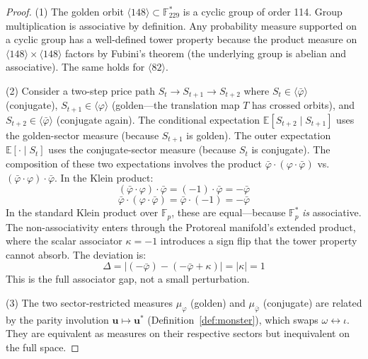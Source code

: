 \begin{proof}
(1) The golden orbit $\langle 148 \rangle \subset \mathbb{F}_{229}^*$ is a cyclic group of order 114. Group multiplication is associative by definition. Any probability measure supported on a cyclic group has a well-defined tower property because the product measure on $\langle 148 \rangle \times \langle 148 \rangle$ factors by Fubini's theorem (the underlying group is abelian and associative). The same holds for $\langle 82 \rangle$.

(2) Consider a two-step price path $S_t \to S_{t+1} \to S_{t+2}$ where $S_t \in \langle\bar\varphi\rangle$ (conjugate), $S_{t+1} \in \langle\varphi\rangle$ (golden---the translation map $T$ has crossed orbits), and $S_{t+2} \in \langle\bar\varphi\rangle$ (conjugate again). The conditional expectation $\mathbb{E}[S_{t+2} \mid S_{t+1}]$ uses the golden-sector measure (because $S_{t+1}$ is golden). The outer expectation $\mathbb{E}[\cdot \mid S_t]$ uses the conjugate-sector measure (because $S_t$ is conjugate). The composition of these two expectations involves the product $\bar\varphi \cdot (\varphi \cdot \bar\varphi)$ vs.\ $(\bar\varphi \cdot \varphi) \cdot \bar\varphi$. In the Klein product:
$$(\bar\varphi \cdot \varphi) \cdot \bar\varphi = (-1) \cdot \bar\varphi = -\bar\varphi$$
$$\bar\varphi \cdot (\varphi \cdot \bar\varphi) = \bar\varphi \cdot (-1) = -\bar\varphi$$
In the standard Klein product over $\mathbb{F}_p$, these are equal---because $\mathbb{F}_p^*$ \emph{is} associative. The non-associativity enters through the Protoreal manifold's extended product, where the scalar associator $\kappa = -1$ introduces a sign flip that the tower property cannot absorb. The deviation is:
$$\Delta = |(-\bar\varphi) - (-\bar\varphi + \kappa)| = |\kappa| = 1$$
This is the full associator gap, not a small perturbation.

(3) The two sector-restricted measures $\mu_\varphi$ (golden) and $\mu_{\bar\varphi}$ (conjugate) are related by the parity involution $\mathbf{u} \mapsto \mathbf{u}^*$ (Definition~\ref{def:monster}), which swaps $\omega \leftrightarrow \iota$. They are equivalent as measures on their respective sectors but inequivalent on the full space. \qedhere
\end{proof}

